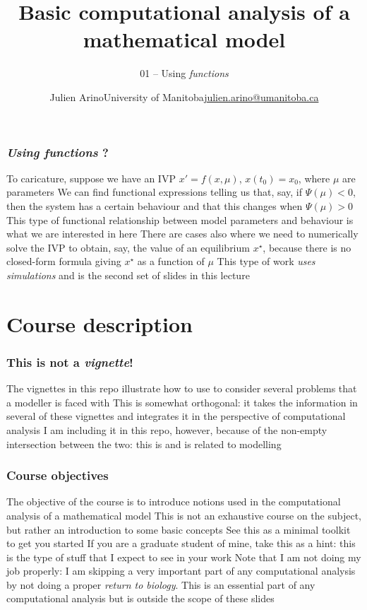 \documentclass[aspectratio=169]{beamer}\usepackage[]{graphicx}\usepackage[]{xcolor}
\title[Basic computational analysis]{Basic computational analysis of a mathematical model}
\subtitle{01 -- Using \textit{functions}}
\author{\texorpdfstring{Julien Arino\newline University of Manitoba\newline\url{julien.arino@umanitoba.ca}}{Julien Arino}}
\date{}
\begin{document}

\begin{frame}\frametitle{\emph{Using functions} ?}
To caricature, suppose we have an IVP $x'=f(x,\mu)$, $x(t_0)=x_0$, where $\mu$ are parameters
\vfill
We can find functional expressions telling us that, say, if $\Psi(\mu)<0$, then the system has a certain behaviour and that this changes when $\Psi(\mu)>0$
\vfill
This type of functional relationship between model parameters and behaviour is what we are interested in here
\vfill
There are cases also where we need to numerically solve the IVP to obtain, say, the value of an equilibrium $x^\star$, because there is no closed-form formula giving $x^\star$ as a function of $\mu$
\vfill
This type of work \emph{uses simulations} and is the second set of slides in this lecture
\end{frame}


\section{Course description}

\begin{frame}\frametitle{This is not a \emph{vignette}!}
The vignettes in this repo illustrate how to use  to consider several problems that a modeller is faced with
\vfill
This is somewhat orthogonal: it takes the information in several of these vignettes and integrates it in the perspective of computational analysis
\vfill
I am including it in this repo, however, because of the non-empty intersection between the two: this is  and is related to modelling
\end{frame}

\begin{frame}\frametitle{Course objectives}
The objective of the course is to introduce notions used in the computational analysis of a mathematical model
\vfill
This is not an exhaustive course on the subject, but rather an introduction to some basic concepts
\vfill
See this as a minimal toolkit to get you started
\vfill
If you are a graduate student of mine, take this as a hint: this is the type of stuff that I expect to see in your work
\vfill
Note that I am not doing my job properly: I am skipping a very important part of any computational analysis by not doing a proper \emph{return to biology}. This is an essential part of any computational analysis but is outside the scope of these slides
\end{frame}
\end{document}
